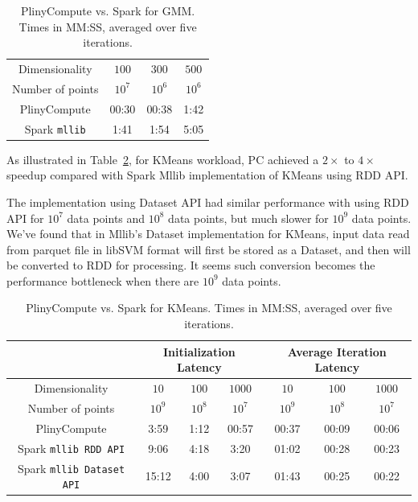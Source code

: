 \begin{table}[h!]
\begin{center}
\begin{tabular}{|c||c|c|c||}
\hline
Dimensionality & $100$ & $300$ & $500$ \\
Number of points & $10^7$ & $10^6$ & $10^6$ \\
\hline
\hline
PlinyCompute &00:30 & 00:38 & 1:42 \\
Spark \texttt{mllib} &1:41  &1:54 &5:05 \\
\hline
\end{tabular}
\caption{PlinyCompute vs. Spark for GMM. Times in MM:SS, averaged over five iterations.}
\label{fig:Gmm}
\end{center}
\end{table}



\vspace{5pt}
As illustrated in Table~\ref{fig:KMeans}, for KMeans workload, PC achieved a $2\times$ to
$4\times$ speedup compared with Spark Mllib implementation of KMeans
using RDD API. 

The implementation using Dataset API had similar
performance with using RDD API for $10^7$ data points and $10^8$ data
points, but much slower for $10^9$ data points. We've found that
in Mllib's Dataset implementation for KMeans, input data read from
parquet file in libSVM format will first be stored as a Dataset, and
then will be converted to RDD for processing. It seems such conversion
becomes the performance bottleneck when there are $10^9$ data points.

\begin{table}[h!]
\begin{center}
\begin{tabular}{|c||c|c|c||c|c|c||}
\hline
& \multicolumn{3}{c||}{Initialization Latency} & \multicolumn{3}{c||}{Average
                                         Iteration Latency} \\
\hline
Dimensionality & $10$ & $100$ & $1000$ & $10$ & $100$ & $1000$\\
Number of points & $10^9$ & $10^8$ & $10^7$ & $10^9$ & $10^8$ & $10^7$\\
\hline
PlinyCompute &3:59 & 1:12 & 00:57 &00:37 & 00:09 & 00:06\\
Spark \texttt{mllib RDD API} &9:06  &4:18 &3:20 &01:02 & 00:28 & 00:23\\
Spark \texttt{mllib Dataset API} &15:12  &4:00 &3:07 &01:43 & 00:25 & 00:22\\
\hline
\end{tabular}
\caption{PlinyCompute vs. Spark for KMeans. Times in MM:SS, averaged over five iterations.}
\label{fig:KMeans}
\end{center}
\end{table}


